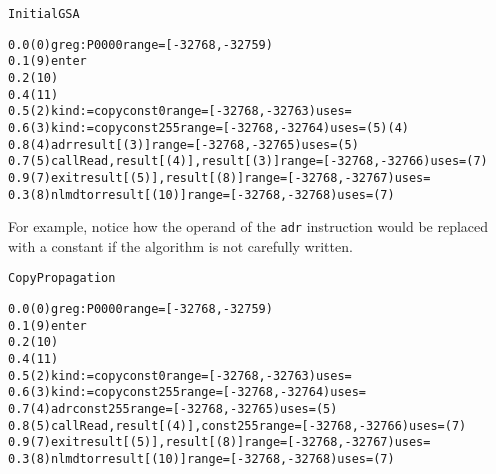 \begin{small}
\begin{alltt}
Initial GSA

0.0 (0)  greg: P0000 range=[-32768, -32759)
  0.1 (9)  enter %nlm  range=[-32768, -32760) uses={}
   0.2 (10)  %nlm := nlmctor  range=[-32762, -32761) uses={(8)}
   0.4 (11)  %return-2 := copy const{FALSE}  range=[-32762, -32762) uses={}
  0.5 (2)  kind := copy const{0}  range=[-32768, -32763) uses={}
  0.6 (3)  kind := copy const{255}  range=[-32768, -32764) uses={(5) (4)}
  0.8 (4)  adr result[(3)]  range=[-32768, -32765) uses={(5)}
  0.7 (5)  call Read , result[(4)] , result[(3)]  range=[-32768, -32766) uses={(7)}
  0.9 (7)  exit result[(5)] , result[(8)]  range=[-32768, -32767) uses={}
   0.3 (8)  nlmdtor result[(10)]  range=[-32768, -32768) uses={(7)}
\end{alltt}
\end{small}


For example, notice how the operand of the \texttt{adr} instruction
would be replaced with a constant if the algorithm is not carefully
written.

\begin{small}
\begin{alltt}
Copy Propagation

0.0 (0)  greg: P0000 range=[-32768, -32759)
  0.1 (9)  enter %nlm  range=[-32768, -32760) uses={}
   0.2 (10)  %nlm := nlmctor  range=[-32762, -32761) uses={(8)}
   0.4 (11)  %return-2 := copy const{FALSE}  range=[-32762, -32762) uses={}
  0.5 (2)  kind := copy const{0}  range=[-32768, -32763) uses={}
  0.6 (3)  kind := copy const{255}  range=[-32768, -32764) uses={}
  0.7 (4)  adr const{255}  range=[-32768, -32765) uses={(5)}
  0.8 (5)  call Read , result[(4)] , const{255}  range=[-32768, -32766) uses={(7)}
  0.9 (7)  exit result[(5)] , result[(8)]  range=[-32768, -32767) uses={}
   0.3 (8)  nlmdtor result[(10)]  range=[-32768, -32768) uses={(7)}
\end{alltt}
\end{small}
